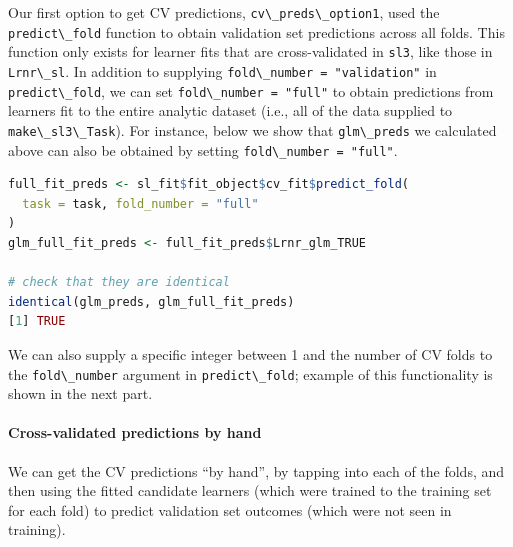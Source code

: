 \documentclass[
  12pt, krantz2,
]{krantz}
\newcommand{\passthrough}[1]{#1}
\newcommand{\1}{\mathbbm{1}}
\theoremstyle{definition}
\theoremstyle{definition}
\theoremstyle{definition}
\theoremstyle{definition}
\theoremstyle{remark}
\begin{document}
Our first option to get CV predictions, \passthrough{\lstinline!cv\_preds\_option1!}, used the
\passthrough{\lstinline!predict\_fold!} function to obtain validation set predictions across all folds.
This function only exists for learner fits that are cross-validated in \passthrough{\lstinline!sl3!},
like those in \passthrough{\lstinline!Lrnr\_sl!}. In addition to supplying \passthrough{\lstinline!fold\_number = "validation"!}
in \passthrough{\lstinline!predict\_fold!}, we can set \passthrough{\lstinline!fold\_number = "full"!} to obtain predictions from
learners fit to the entire analytic dataset (i.e., all of the data supplied to
\passthrough{\lstinline!make\_sl3\_Task!}). For instance, below we show that \passthrough{\lstinline!glm\_preds!} we calculated
above can also be obtained by setting \passthrough{\lstinline!fold\_number = "full"!}.

\begin{lstlisting}[language=R]
full_fit_preds <- sl_fit$fit_object$cv_fit$predict_fold(
  task = task, fold_number = "full"
)
glm_full_fit_preds <- full_fit_preds$Lrnr_glm_TRUE

# check that they are identical
identical(glm_preds, glm_full_fit_preds)
[1] TRUE
\end{lstlisting}

We can also supply a specific integer between 1 and the number of CV folds
to the \passthrough{\lstinline!fold\_number!} argument in \passthrough{\lstinline!predict\_fold!}; example of this
functionality is shown in the next part.

\hypertarget{cross-validated-predictions-by-hand}{%
\paragraph*{Cross-validated predictions by hand}\label{cross-validated-predictions-by-hand}}

We can get the CV predictions ``by hand'', by tapping into each of the folds, and
then using the fitted candidate learners (which were trained to the training
set for each fold) to predict validation set outcomes (which were not seen in
training).
\end{document}
